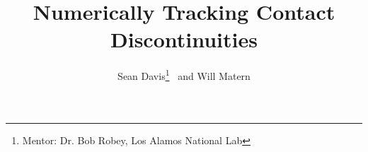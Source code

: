 \documentclass{article}
\newcommand*\samethanks[1][\value{footnote}]{\footnotemark[#1]}
\begin{document}
\title{Numerically Tracking Contact Discontinuities}
\author{Sean Davis\thanks{Mentor: Dr. Bob Robey, Los Alamos National Lab} \ and Will Matern\samethanks}
\maketitle

















\end{document}
